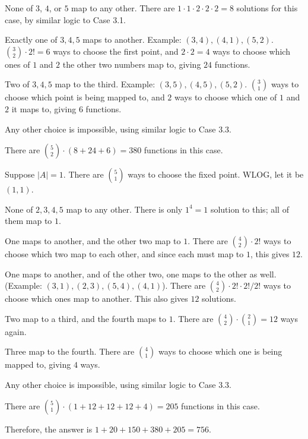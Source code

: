 \documentclass{article}
\begin{document}
\begin{Cases}
        \begin{Cases}[label* = \arabic*., itemindent = .6in, topsep = 0.04in]
            \item None of $3$, $4$, or $5$ map to any other. There are $1 \cdot 1 \cdot 2 \cdot 2 \cdot 2 = 8$ solutions for this case, by similar logic to Case 3.1.
            \item Exactly one of $3, 4, 5$ maps to another. Example: $(3, 4), (4, 1), (5, 2)$. $\binom 32 \cdot 2! = 6$ ways to choose the first point, and $2 \cdot 2 = 4$ ways to choose which ones of $1$ and $2$ the other two numbers map to, giving $24$ functions.
            \item Two of $3, 4, 5$ map to the third. Example: $(3, 5), (4, 5), (5, 2)$. $\binom 31$ ways to choose which point is being mapped to, and $2$ ways to choose which one of $1$ and $2$ it maps to, giving $6$ functions.
            \item Any other choice is impossible, using similar logic to Case 3.3.
        \end{Cases}
        There are $\binom 52 \cdot (8+24+6) = 380$ functions in this case.
        \item Suppose $|A| = 1$. There are $\binom{5}{1}$ ways to choose the fixed point. WLOG, let it be $(1, 1)$.
        
        \begin{Cases}[label* = \arabic*., itemindent = .6in, topsep = 0.04in]
            \item None of $2, 3, 4, 5$ map to any other. There is only $1^4 = 1$ solution to this; all of them map to $1$.
            \item One maps to another, and the other two map to $1$. There are $\binom 42 \cdot 2!$ ways to choose which two map to each other, and since each must map to $1$, this gives $12$.
            \item One maps to another, and of the other two, one maps to the other as well. (Example: $(3, 1), (2, 3), (5, 4), (4, 1)$). There are $\binom 42 \cdot 2! \cdot 2! / 2!$ ways to choose which ones map to another. This also gives $12$ solutions.
            \item Two map to a third, and the fourth maps to $1$. There are $\binom 42 \cdot \binom 21 = 12$ ways again.
            \item Three map to the fourth. There are $\binom 41$ ways to choose which one is being mapped to, giving $4$ ways.
            \item Any other choice is impossible, using similar logic to Case 3.3.
        \end{Cases}
        There are $\binom{5}{1} \cdot (1 + 12 + 12 + 12 + 4) = 205$ functions in this case.
    \end{Cases}
    Therefore, the answer is $1 + 20 + 150 + 380 + 205 = \boxed{756}$.
\end{document}
